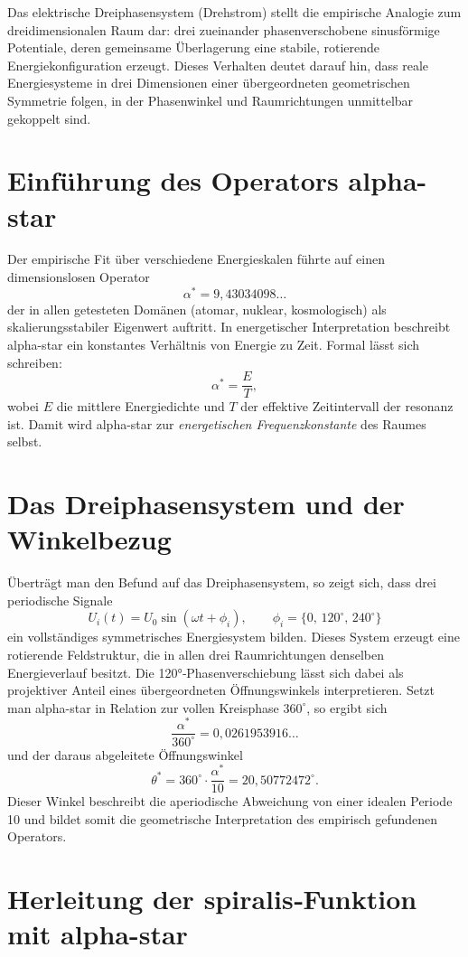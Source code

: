 Das elektrische Dreiphasensystem (Drehstrom)
stellt die empirische Analogie zum dreidimensionalen Raum dar:
drei zueinander phasenverschobene sinusförmige Potentiale,
deren gemeinsame Überlagerung eine stabile, rotierende
Energiekonfiguration erzeugt.
Dieses Verhalten deutet darauf hin, dass reale Energiesysteme
in drei Dimensionen einer übergeordneten geometrischen Symmetrie folgen,
in der Phasenwinkel und Raumrichtungen unmittelbar gekoppelt sind.

\section{Einführung des Operators \gls{alpha-star}}

Der empirische Fit über verschiedene Energieskalen
führte auf einen dimensionslosen Operator
\[
\alpha^* = 9{,}43034098\dots
\]
der in allen getesteten Domänen (atomar, nuklear, kosmologisch)
als skalierungsstabiler Eigenwert auftritt.
In energetischer Interpretation beschreibt \gls{alpha-star}
ein konstantes Verhältnis von Energie zu Zeit.
Formal lässt sich schreiben:
\[
\alpha^* = \frac{E}{T},
\]
wobei $E$ die mittlere Energiedichte
und $T$ der effektive Zeitintervall der \gls{resonanz} ist.
Damit wird \gls{alpha-star} zur \emph{energetischen Frequenzkonstante}
des Raumes selbst.

\section{Das Dreiphasensystem und der Winkelbezug}

Überträgt man den Befund auf das Dreiphasensystem,
so zeigt sich, dass drei periodische Signale
\[
U_i(t) = U_0 \sin(\omega t + \phi_i),
\qquad
\phi_i = \{0,\,120^\circ,\,240^\circ\}
\]
ein vollständiges symmetrisches Energiesystem bilden.
Dieses System erzeugt eine rotierende Feldstruktur,
die in allen drei Raumrichtungen denselben Energieverlauf besitzt.
Die 120°‐Phasenverschiebung lässt sich dabei
als projektiver Anteil eines übergeordneten Öffnungswinkels interpretieren.
Setzt man \gls{alpha-star} in Relation zur vollen Kreisphase $360^\circ$,
so ergibt sich
\[
\frac{\alpha^*}{360^\circ} = 0{,}0261953916\dots
\]
und der daraus abgeleitete Öffnungswinkel
\[
\theta^* = 360^\circ \cdot \frac{\alpha^*}{10} = 20{,}50772472^\circ.
\]
Dieser Winkel beschreibt die aperiodische Abweichung
von einer idealen Periode 10
und bildet somit die geometrische Interpretation
des empirisch gefundenen Operators.

\section{Herleitung der \gls{spiralis}‐Funktion mit \gls{alpha-star}}

